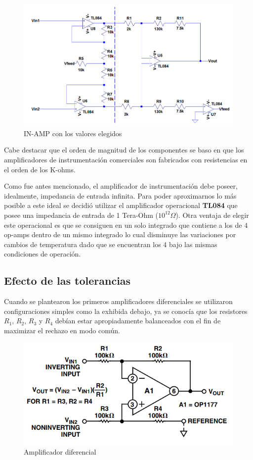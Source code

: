 \documentclass[a4paper]{article}
\begin{document}
\begin{figure}[H]
	\centering
	\includegraphics[width=\linewidth]{../ImagenesVarias/IN-AMP-CON-VALORES.png}
	\caption{IN-AMP con los valores elegidos}
\end{figure}

  Cabe destacar que el orden de magnitud de los componentes se baso en que los amplificadores de instrumentación comerciales son fabricados con resistencias en el orden de los K-ohms.
  
  Como fue antes mencionado, el amplificador de instrumentación debe poseer, idealmente, impedancia de entrada infinita. Para poder aproximarnos lo más posible a este ideal se decidió utilizar el amplificador operacional \textbf{TL084} que posee una impedancia de entrada de 1 Tera-Ohm ($10^{12}\Omega$). Otra ventaja de elegir este operacional es que se consiguen en un solo integrado que contiene a los de 4 op-amps dentro de un mismo integrado lo cual disminuye las variaciones por cambios de temperatura dado que se encuentran los 4 bajo las mismas condiciones de operación.
  
\subsection{Efecto de las tolerancias}
Cuando se plantearon los primeros amplificadores diferenciales se utilizaron configuraciones simples como la exhibida debajo, ya se conocía que los resistores $R_1$, $R_2$, $R_3$ y $R_4$ debían estar apropiadamente balanceados con el fin de maximizar el rechazo en modo común. 
\begin{figure}[H]
	\centering
	\includegraphics[width=\linewidth]{../ImagenesVarias/AmplificadorDiferencial.PNG}
	\caption{Amplificador diferencial}
\end{figure}  
\end{document}
